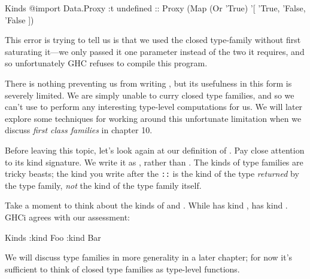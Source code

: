 \documentclass[book.tex]{subfiles}
\begin{document}
\begin{dorepl}{Kinds}
@import Data.Proxy
:t undefined :: Proxy (Map (Or 'True) '[ 'True, 'False, 'False ])
\end{dorepl}

This error is trying to tell us is that we used the  closed type-family
without first saturating it---we only passed it one parameter instead of the two
it requires, and so unfortunately GHC refuses to compile this program.

There is nothing preventing us from writing , but its usefulness in this
form is severely limited. We are simply unable to curry closed type families,
and so we can't use  to perform any interesting type-level computations
for us. We will later explore some techniques for working around this
unfortunate limitation when we discuss \emph{first class families} in chapter 10.


Before leaving this topic, let's look again at our definition of . Pay
close attention to its kind signature. We write it as , rather than . The kinds of type families are tricky beasts;
the kind you write after the \texttt{::} is the kind of the type \emph{returned}
by the type family, \emph{not} the kind of the type family itself.


Take a moment to think about the kinds of  and . While 
has kind ,  has kind . GHCi agrees with our assessment:

\begin{dorepl}{Kinds}
:kind Foo
:kind Bar
\end{dorepl}

We will discuss type families in more generality in a later chapter; for now
it's sufficient to think of closed type families as type-level functions.
\end{document}
